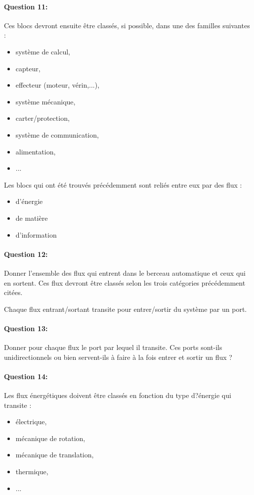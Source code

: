 \paragraph{Question 11:} Ces blocs devront ensuite être classés, si possible, dans une des familles suivantes : 
\begin{itemize}
 \item système de calcul, 
 \item capteur,
 \item effecteur (moteur, vérin,...),
 \item système mécanique,
 \item carter/protection, 
 \item système de communication,
 \item alimentation,
 \item ... 
\end{itemize}


Les blocs qui ont été trouvés précédemment sont reliés entre eux par des flux :
\begin{itemize}
 \item d'énergie
 \item de matière
 \item d'information
\end{itemize}

\paragraph{Question 12:} Donner l'ensemble des flux qui entrent dans le berceau automatique et ceux qui en sortent. Ces flux devront être classés selon les trois catégories précédemment citées.

Chaque flux entrant/sortant transite pour entrer/sortir du système par un port.

\paragraph{Question 13:} Donner pour chaque flux le port par lequel il transite. Ces ports sont-ils unidirectionnels ou bien servent-ils à faire à la fois entrer et sortir un flux ?

	
\paragraph{Question 14:} Les flux énergétiques doivent être classés en fonction du type d?énergie qui transite :
\begin{itemize}
 \item électrique,
 \item mécanique de rotation,
 \item mécanique de translation,
 \item thermique,
 \item ...
\end{itemize}

